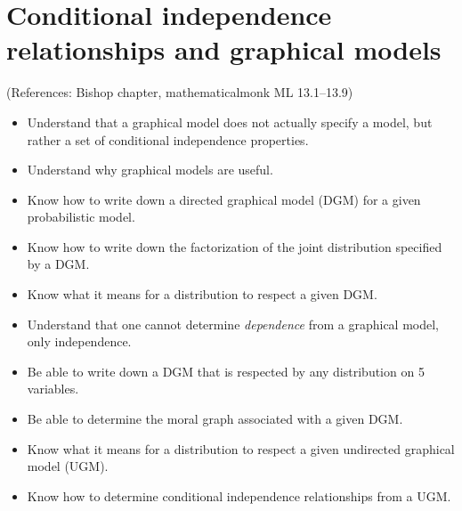 \documentclass[12pt]{article}
\begin{document}
\section{Conditional independence relationships and graphical models}
(References: Bishop chapter, mathematicalmonk ML 13.1--13.9)
\begin{itemize}
\setlength\itemsep{0em}
\item Understand that a graphical model does not actually specify a model, but rather a set of conditional independence properties.
\item Understand why graphical models are useful.
\item Know how to write down a directed graphical model (DGM) for a given probabilistic model.
\item Know how to write down the factorization of the joint distribution specified by a DGM.
\item Know what it means for a distribution to respect a given DGM.
\item Understand that one cannot determine \textit{dependence} from a graphical model, only independence.
\item Be able to write down a DGM that is respected by any distribution on 5 variables.
\item Be able to determine the moral graph associated with a given DGM.
\item Know what it means for a distribution to respect a given undirected graphical model (UGM).
\item Know how to determine conditional independence relationships from a UGM.
\end{itemize}
\end{document}
